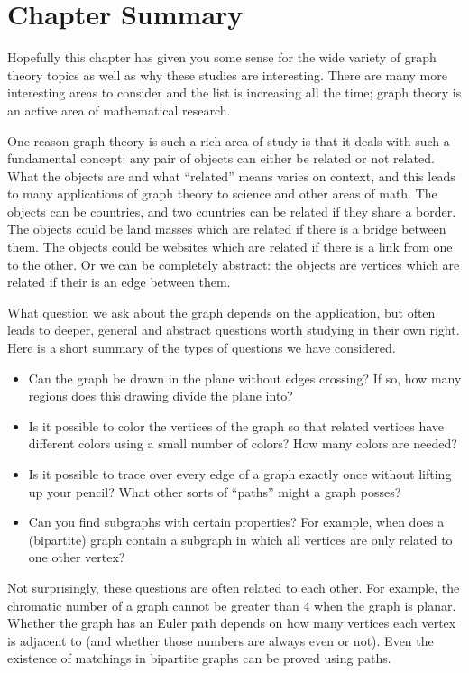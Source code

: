 \documentclass[12pt]{article}
\begin{document}
\section{Chapter Summary}

Hopefully this chapter has given you some sense for the wide variety of graph theory topics as well as why these studies are interesting.  There are many more interesting areas to consider and the list is increasing all the time; graph theory is an active area of mathematical research.  

One reason graph theory is such a rich area of study is that it deals with such a fundamental concept: any pair of objects can either be related or not related.  What the objects are and what ``related'' means varies on context, and this leads to many applications of graph theory to science and other areas of math.  The objects can be countries, and two countries can be related if they share a border.  The objects could be land masses which are related if there is a bridge between them.  The objects could be websites which are related if there is a link from one to the other.  Or we can be completely abstract: the objects are vertices which are related if their is an edge between them.

What question we ask about the graph depends on the application, but often leads to deeper, general and abstract questions worth studying in their own right.  Here is a short summary of the types of questions we have considered.

\begin{itemize}
\item Can the graph be drawn in the plane without edges crossing?  If so, how many regions does this drawing divide the plane into?
\item Is it possible to color the vertices of the graph so that related vertices have different colors using a small number of colors?  How many colors are needed?
\item Is it possible to trace over every edge of a graph exactly once without lifting up your pencil?  What other sorts of ``paths'' might a graph posses?
\item Can you find subgraphs with certain properties?  For example, when does a (bipartite) graph contain a subgraph in which all vertices are only related to one other vertex?
\end{itemize}

Not surprisingly, these questions are often related to each other.  For example, the chromatic number of a graph cannot be greater than 4 when the graph is planar.  Whether the graph has an Euler path depends on how many vertices each vertex is adjacent to (and whether those numbers are always even or not).  Even the existence of matchings in bipartite graphs can be proved using paths.
\end{document}
